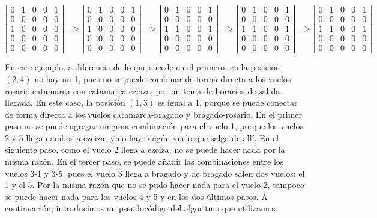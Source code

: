\documentclass[11pt, a4paper, twoside]{article}
\begin{document}
\[ \left| \begin{array}{ccccc}
  0 & 1 & 0 & 0 & 1 \\
  0 & 0 & 0 & 0 & 0 \\
  1 & 0 & 0 & 0 & 0 \\
  0 & 0 & 0 & 0 & 0 \\
  0 & 0 & 0 & 0 & 0 \end{array} \right| ->
  \left| \begin{array}{ccccc}
  0 & 1 & 0 & 0 & 1 \\
  0 & 0 & 0 & 0 & 0 \\
  1 & 0 & 0 & 0 & 0 \\
  0 & 0 & 0 & 0 & 0 \\
  0 & 0 & 0 & 0 & 0 \end{array} \right| ->
  \left| \begin{array}{ccccc}
  0 & 1 & 0 & 0 & 1 \\
  0 & 0 & 0 & 0 & 0 \\
  1 & 1 & 0 & 0 & 1 \\
  0 & 0 & 0 & 0 & 0 \\
  0 & 0 & 0 & 0 & 0 \end{array} \right| ->
  \left| \begin{array}{ccccc}
  0 & 1 & 0 & 0 & 1 \\
  0 & 0 & 0 & 0 & 0 \\
  1 & 1 & 0 & 0 & 1 \\
  0 & 0 & 0 & 0 & 0 \\
  0 & 0 & 0 & 0 & 0 \end{array} \right| ->
  \left| \begin{array}{ccccc}
  0 & 1 & 0 & 0 & 1 \\
  0 & 0 & 0 & 0 & 0 \\
  1 & 1 & 0 & 0 & 1 \\
  0 & 0 & 0 & 0 & 0 \\
  0 & 0 & 0 & 0 & 0 \end{array} \right|
\] 

En este ejemplo, a diferencia de lo que sucede en el primero, en la posición 
$(2,4)$ no hay un 1, pues no se puede combinar de forma directa a los vuelos
rosario-catamarca con catamarca-ezeiza, por un tema de horarios de salida-llegada.
En este caso, la posición $(1,3)$ es igual a 1, porque se puede conectar de forma
directa a los vuelos catamarca-bragado y bragado-rosario. En el primer paso no se
puede agregar ninguna combinación para el vuelo 1, porque los vuelos 2 y 5 llegan
ambos a ezeiza, y no hay ningún vuelo que salga de allí. En el siguiente paso, como
el vuelo 2 llega a ezeiza, no se puede hacer nada por la misma razón. En el tercer 
paso, se puede añadir las combinaciones entre los vuelos 3-1 y 3-5, pues el vuelo 3
llega a bragado y de bragado salen dos vuelos: el 1 y el 5. Por la misma razón
que no se pudo hacer nada para el vuelo 2, tampoco se puede hacer nada para los vuelos
4 y 5 y en los dos últimos pasos. A continuación, introducimos un 
pseudocódigo del algoritmo que utilizamos. \\
\end{document}
